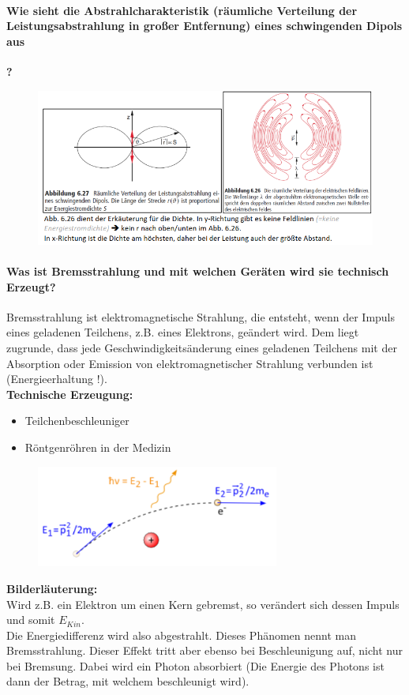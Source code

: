 \documentclass[a4paper, 11pt, parskip=half]{scrartcl}
\begin{document}
\paragraph{Wie sieht die Abstrahlcharakteristik (räumliche Verteilung der Leistungsabstrahlung in
großer Entfernung) eines schwingenden Dipols aus}\textbf{?}
\begin{figure}[H]
    \centering
    \includegraphics[width=14cm]{image/12/5.png}
\end{figure}


\paragraph{Was ist Bremsstrahlung und mit welchen Geräten wird sie technisch Erzeugt?}
Bremsstrahlung ist elektromagnetische Strahlung, die entsteht, wenn der Impuls eines geladenen Teilchens, z.B. eines Elektrons, geändert wird. Dem liegt zugrunde, dass jede Geschwindigkeitsänderung eines geladenen Teilchens mit der Absorption oder Emission von elektromagnetischer Strahlung verbunden ist (Energieerhaltung !).\\
\textbf{Technische Erzeugung:} \\
\begin{itemize}
\item Teilchenbeschleuniger
\item Röntgenröhren in der Medizin
\end{itemize}
\begin{figure}[H]
    \centering
    \includegraphics[width=8cm]{image/12/6.png}
\end{figure}
\textbf{Bilderläuterung:} \\
Wird z.B. ein Elektron um einen Kern gebremst, so verändert sich dessen Impuls und somit $E_{Kin}$. \\
Die Energiedifferenz wird also abgestrahlt. Dieses Phänomen nennt man Bremsstrahlung. Dieser Effekt tritt aber ebenso bei Beschleunigung auf, nicht nur bei Bremsung. Dabei wird ein Photon absorbiert (Die Energie des Photons ist dann der Betrag, mit welchem beschleunigt wird).
\end{document}
